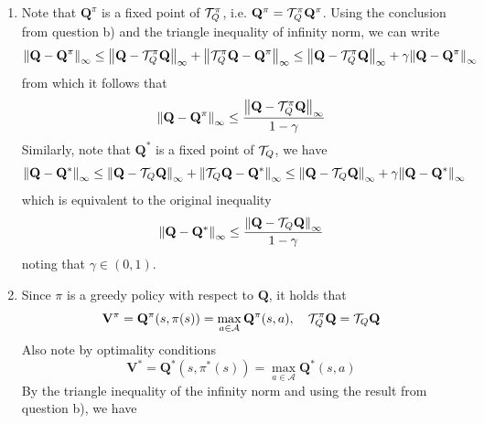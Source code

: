 \begin{Solution}
\begin{enumerate} [label=\alph*)]
$$\begin{aligned}
        & \leq \max_{s \in \mathcal{S}} \gamma \left [ \sum_{s' \in \mathcal{S}} P(s' \mid s, a) \left (\sum_{a' \in \mathcal{A}} \pi(a' \mid s') \max_{a' \in \mathcal{A}} \abs{\mathbf{Q}(s', a') - \mathbf{Q}'(s', a')} \right ) \right ] \\
        & \leq \max_{s \in \mathcal{S}} \gamma \left [ \sum_{s' \in \mathcal{S}} P(s' \mid s, a) \sum_{a' \in \mathcal{A}} \pi(a' \mid s') \norm{\mathbf{Q} - \mathbf{Q}'}_\infty \right ] \\
        & = \gamma \norm{\mathbf{Q} - \mathbf{Q}'}_\infty
        \end{aligned}
        $$
        \item
        Note that $\mathbf{Q}^{\pi}$ is a fixed point of $\ST_Q^{\pi}$, i.e. $\mathbf{Q}^{\pi} = \ST_Q^{\pi} \mathbf{Q}^{\pi}$. Using the conclusion from question b) and the triangle inequality of infinity norm, we can write
        $$
        \norm{\mathbf{Q} - \mathbf{Q}^{\pi}}_\infty \leq \norm{\mathbf{Q} - \ST_Q^{\pi} \mathbf{Q}}_\infty + \norm{\ST_Q^{\pi} \mathbf{Q} - \mathbf{Q}^{\pi}}_\infty \leq \norm{\mathbf{Q} - \ST_Q^{\pi} \mathbf{Q}}_\infty + \gamma \norm{\mathbf{Q} - \mathbf{Q}^{\pi}}_\infty
        $$
        from which it follows that
        $$
        \norm{\mathbf{Q} - \mathbf{Q}^{\pi}}_\infty \leq  \frac{\norm{\mathbf{Q} - \mathcal{T}_Q^\pi \mathbf{Q}}_\infty}{1-\gamma}
        $$
        Similarly, note that $\mathbf{Q}^{*}$ is a fixed point of $\ST_Q$, we have
        $$
        \norm{\mathbf{Q} - \mathbf{Q}^{*}}_\infty \leq \norm{\mathbf{Q} - \ST_Q \mathbf{Q}}_\infty + \norm{\ST_Q \mathbf{Q} - \mathbf{Q}^{*}}_\infty \leq \norm{\mathbf{Q} - \ST_Q \mathbf{Q}}_\infty + \gamma \norm{\mathbf{Q} - \mathbf{Q}^{*}}_\infty
        $$
        which is equivalent to the original inequality
        $$
        \norm{\mathbf{Q} - \mathbf{Q}^{*}}_\infty \leq  \frac{\norm{\mathbf{Q} - \mathcal{T}_Q \mathbf{Q}}_\infty}{1-\gamma}
        $$
        noting that $\gamma \in (0,1)$.
        \item
        Since $\pi$ is a greedy policy with respect to $\mathbf{Q}$, it holds that
        $$
        \mathbf{V}^\pi = \mathbf{Q}^\pi(s,\pi(s)) = \max_{a \in \mathcal{A}} \mathbf{Q}^\pi(s,a), \quad \ST_Q^\pi \mathbf{Q} = \ST_Q \mathbf{Q}
        $$
        Also note by optimality conditions
        $$
        \mathbf{V}^* = \mathbf{Q}^*(s,\pi^*(s)) = \max_{a \in \mathcal{A}} \mathbf{Q}^*(s,a)
        $$
        By the triangle inequality of the infinity norm and using the result from question b), we have
        $$
        \begin{aligned}

\end{aligned}$$
\end{enumerate}
\end{Solution}
